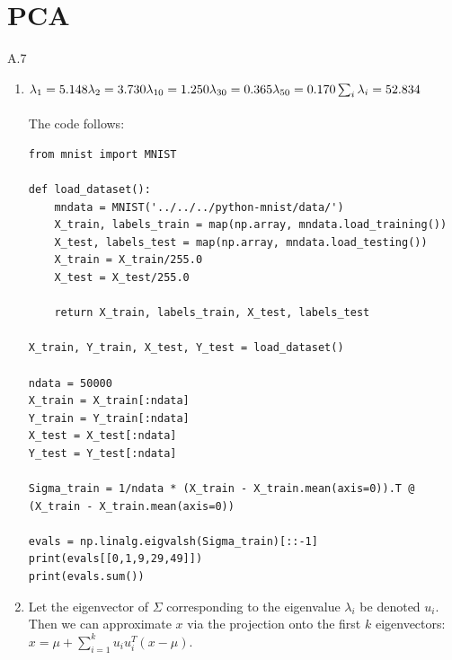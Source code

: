 \documentclass{article}
\begin{document}
\newpage

\section*{PCA}
A.7

\begin{enumerate}
        \item 
        $\lambda_1 = 5.148 \\
        \lambda_2 = 3.730 \\
        \lambda_{10} = 1.250 \\
        \lambda_{30} = 0.365 \\
        \lambda_{50} = 0.170 \\
        \sum_i \lambda_i = 52.834$ \\ \, \\
        The code follows:
        \begin{verbatim}
from mnist import MNIST

def load_dataset():
    mndata = MNIST('../../../python-mnist/data/')
    X_train, labels_train = map(np.array, mndata.load_training())
    X_test, labels_test = map(np.array, mndata.load_testing())
    X_train = X_train/255.0
    X_test = X_test/255.0
    
    return X_train, labels_train, X_test, labels_test

X_train, Y_train, X_test, Y_test = load_dataset()

ndata = 50000
X_train = X_train[:ndata]
Y_train = Y_train[:ndata]
X_test = X_test[:ndata]
Y_test = Y_test[:ndata]

Sigma_train = 1/ndata * (X_train - X_train.mean(axis=0)).T @ (X_train - X_train.mean(axis=0))

evals = np.linalg.eigvalsh(Sigma_train)[::-1]
print(evals[[0,1,9,29,49]])
print(evals.sum())
        \end{verbatim}

        \item Let the eigenvector of $\Sigma$ corresponding to the eigenvalue $\lambda_i$ be denoted $u_i$.
        Then we can approximate $x$ via the projection onto the first $k$ eigenvectors: $ x = \mu + \sum_{i=1}^k u_i u_i^T (x - \mu) $.


\end{enumerate}
\end{document}
